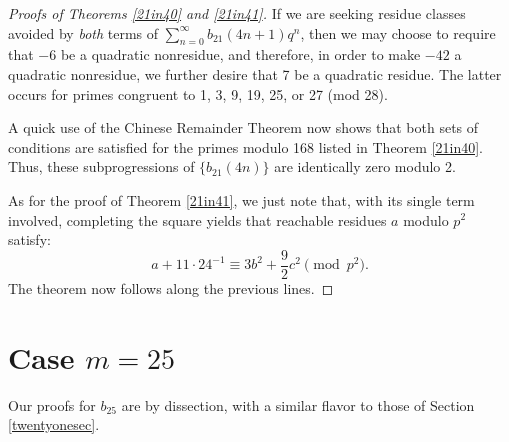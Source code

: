 \documentclass[12pt]{amsart}
\theoremstyle{definition}
\begin{document}
\begin{proof}[Proofs of Theorems \ref{21in40} and \ref{21in41}]
If we are seeking residue classes avoided by \emph{both} terms of $\sum_{n=0}^\infty b_{21}(4n+1)q^n$, then we may choose to require that $-6$ be a quadratic nonresidue, and therefore, in order to make $-42$ a quadratic nonresidue, we further desire that 7 be a quadratic residue.  The latter occurs for primes congruent to 1, 3, 9, 19, 25, or 27 (mod 28).

A quick use of the Chinese Remainder Theorem now shows that both sets of conditions are satisfied for the primes modulo 168 listed in Theorem \ref{21in40}. Thus, these subprogressions of $\{b_{21}(4n)\}$ are identically zero modulo 2.

As for the proof of Theorem \ref{21in41}, we just note that, with its single term involved, completing the square yields that reachable residues $a$ modulo $p^2$ satisfy:
$$a + 11 \cdot 24^{-1} \equiv 3b^2 + \frac{9}{2}c^2 \pmod{p^2}.$$
The theorem now follows along the previous lines. \end{proof}

\section{Case $m=25$}\label{twentyfivesec}

Our proofs for $b_{25}$ are by dissection, with a similar flavor to those of Section \ref{twentyonesec}.
\end{document}
